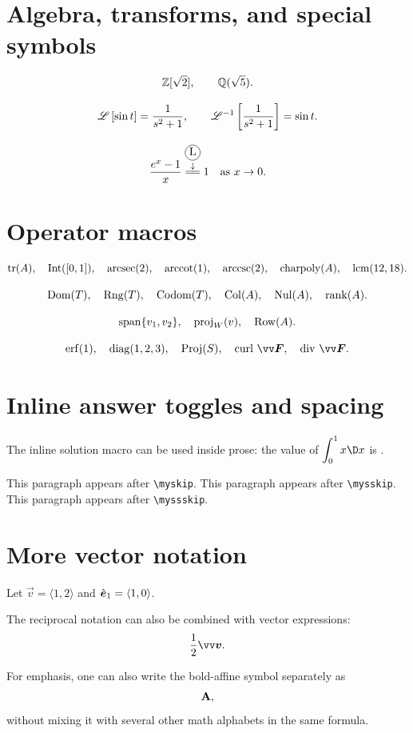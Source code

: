 \section{Algebra, transforms, and special symbols}
\[
\mathbb{Z}[\sqrt{2}],
\qquad
\mathbb{Q}(\sqrt{5}).
\]

\[
\mathscr{L}\left[\sin t\right]=\frac{1}{s^2+1},
\qquad
\mathscr{L}^{-1}\left[\frac{1}{s^2+1}\right]=\sin t.
\]

\[
\frac{e^x-1}{x} \lhequal 1 \quad \text{as } x\to 0.
\]

\section{Operator macros}
\[
\operatorname{tr}(A),\quad \operatorname{Int}([0,1]),\quad \operatorname{arcsec}(2),\quad \operatorname{arccot}(1),\quad \operatorname{arccsc}(2),
\quad \operatorname{charpoly}(A),\quad \operatorname{lcm}(12,18).
\]

\[
\operatorname{Dom}(T),\quad \operatorname{Rng}(T),\quad \operatorname{Codom}(T),\quad \operatorname{Col}(A),\quad \operatorname{Nul}(A),\quad \operatorname{rank}(A).
\]

\[
\operatorname{span}\{v_1,v_2\},\quad \operatorname{proj}_W(v),\quad \operatorname{Row}(A).
\]

\[
\erf(1),\quad \diag(1,2,3),\quad \Proj(S),\quad \curl\,\vec{F},\quad \mydiv\,\vec{F}.
\]

\section{Inline answer toggles and spacing}
The inline solution macro can be used inside prose: the value of $\dint_0^1 x\dx$ is .

\myskip
This paragraph appears after \verb|\myskip|.
\mysskip
This paragraph appears after \verb|\mysskip|.
\myssskip
This paragraph appears after \verb|\myssskip|.

\section{More vector notation}
Let $\vec{v}=\langle 1,2\rangle$ and $\hat{\bm{{e}}}_1=\langle 1,0\rangle$.

The reciprocal notation can also be combined with vector expressions:
\[
\vf{2}\vec{v}.
\]

For emphasis, one can also write the bold-affine symbol separately as
\[
\mathbf{A},
\]
without mixing it with several other math alphabets in the same formula.

